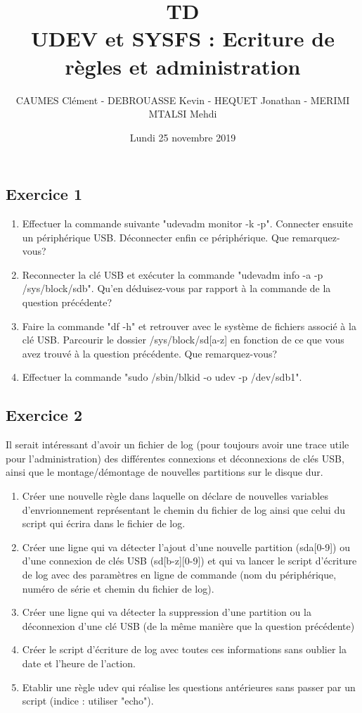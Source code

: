 \documentclass[11pt]{article}
\title{\huge{\textbf {TD} \\UDEV et SYSFS : Ecriture de règles et administration}}
\date{Lundi 25 novembre 2019}
\author{CAUMES Clément - DEBROUASSE Kevin - HEQUET Jonathan - MERIMI MTALSI Mehdi}
\begin{document}
\maketitle

\subsection*{Exercice 1}

\begin{enumerate}
	\item Effectuer la commande suivante "udevadm monitor -k -p". Connecter ensuite un périphérique USB. Déconnecter enfin ce périphérique. Que remarquez-vous? 
	
	\item Reconnecter la clé USB et exécuter la commande "udevadm info -a -p /sys/block/sdb". Qu'en déduisez-vous par rapport à la commande de la question précédente? 
	
	\item Faire la commande "df -h" et retrouver avec le système de fichiers associé à la clé USB. 
	Parcourir le dossier /sys/block/sd[a-z] en fonction de ce que vous avez trouvé à la question précédente. Que remarquez-vous?
	
	\item Effectuer la commande "sudo /sbin/blkid -o udev -p /dev/sdb1". 
	
\end{enumerate}

\subsection*{Exercice 2}

Il serait intéressant d'avoir un fichier de log (pour toujours avoir une trace utile pour l'administration) 
des différentes connexions et déconnexions de clés USB, ainsi que le montage/démontage de nouvelles partitions
sur le disque dur. 

\begin{enumerate}
	\item Créer une nouvelle règle dans laquelle on déclare de nouvelles variables d'envrionnement représentant le 
	chemin du fichier de log ainsi que celui du script qui écrira dans le fichier de log. 
	\item Créer une ligne qui va détecter l'ajout d'une nouvelle partition (sda[0-9]) ou d'une connexion de clés USB (sd[b-z][0-9])
	et qui va lancer le script d'écriture de log avec des paramètres en ligne de commande (nom du périphérique, numéro de série et chemin du fichier de log).
	\item Créer une ligne qui va détecter la suppression d'une partition ou la déconnexion d'une clé USB (de la même manière que la question précédente)
	
	\item Créer le script d'écriture de log avec toutes ces informations sans oublier la date et l'heure de l'action.
	
	\item Etablir une règle udev qui réalise les questions antérieures sans passer par un script (indice : utiliser "echo").

\end{enumerate}
\end{document}
